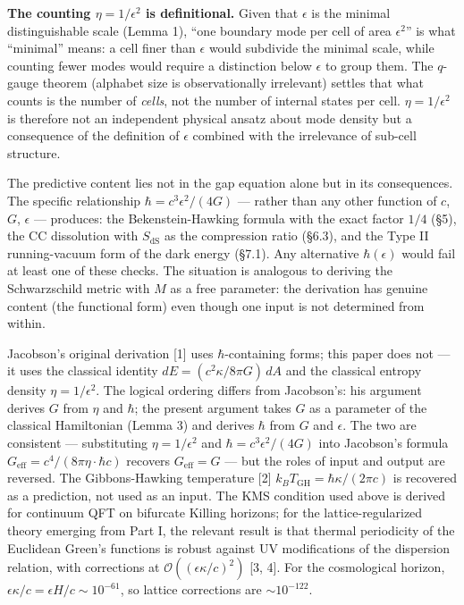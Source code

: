 \documentclass[
]{article}
\begin{document}
\textbf{The counting \(\eta = 1/\epsilon^2\) is definitional.} Given
that \(\epsilon\) is the minimal distinguishable scale (Lemma 1), ``one
boundary mode per cell of area \(\epsilon^2\)'' is what ``minimal''
means: a cell finer than \(\epsilon\) would subdivide the minimal scale,
while counting fewer modes would require a distinction below
\(\epsilon\) to group them. The \(q\)-gauge theorem (alphabet size is
observationally irrelevant) settles that what counts is the number of
\emph{cells}, not the number of internal states per cell.
\(\eta = 1/\epsilon^2\) is therefore not an independent physical ansatz
about mode density but a consequence of the definition of \(\epsilon\)
combined with the irrelevance of sub-cell structure.

The predictive content lies not in the gap equation alone but in its
consequences. The specific relationship \(\hbar = c^3\epsilon^2/(4G)\)
--- rather than any other function of \(c\), \(G\), \(\epsilon\) ---
produces: the Bekenstein-Hawking formula with the exact factor \(1/4\)
(§5), the CC dissolution with \(S_{\text{dS}}\) as the compression ratio
(§6.3), and the Type II running-vacuum form of the dark energy (§7.1).
Any alternative \(\hbar(\epsilon)\) would fail at least one of these
checks. The situation is analogous to deriving the Schwarzschild metric
with \(M\) as a free parameter: the derivation has genuine content (the
functional form) even though one input is not determined from within.

Jacobson's original derivation {[}1{]} uses \(\hbar\)-containing forms;
this paper does not --- it uses the classical identity
\(dE = (c^2 \kappa / 8\pi G)\,dA\) and the classical entropy density
\(\eta = 1/\epsilon^2\). The logical ordering differs from Jacobson's:
his argument derives \(G\) from \(\eta\) and \(\hbar\); the present
argument takes \(G\) as a parameter of the classical Hamiltonian (Lemma
3) and derives \(\hbar\) from \(G\) and \(\epsilon\). The two are
consistent --- substituting \(\eta = 1/\epsilon^2\) and
\(\hbar = c^3\epsilon^2/(4G)\) into Jacobson's formula
\(G_{\text{eff}} = c^4/(8\pi \eta \cdot \hbar c)\) recovers
\(G_{\text{eff}} = G\) --- but the roles of input and output are
reversed. The Gibbons-Hawking temperature {[}2{]}
\(k_B T_{\text{GH}} = \hbar \kappa / (2\pi c)\) is recovered as a
prediction, not used as an input. The KMS condition used above is
derived for continuum QFT on bifurcate Killing horizons; for the
lattice-regularized theory emerging from Part I, the relevant result is
that thermal periodicity of the Euclidean Green's functions is robust
against UV modifications of the dispersion relation, with corrections at
\(\mathcal{O}((\epsilon \kappa/c)^2)\) {[}3, 4{]}. For the cosmological
horizon, \(\epsilon \kappa / c = \epsilon H / c \sim 10^{-61}\), so
lattice corrections are \(\sim 10^{-122}\).
\end{document}
